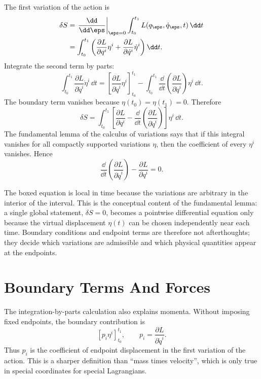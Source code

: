 \begin{derivation}
The first variation of the action is
\[
\begin{aligned}
  \delta S
  &=
  \left.\frac{\dd}{\dd\eps}\right|_{\eps=0}
  \int_{t_0}^{t_1}L(q_\eps,\dot q_\eps,t)\,\dd t\\
  &=
  \int_{t_0}^{t_1}
  \left(
    \frac{\partial L}{\partial q^i}\eta^i
    +
    \frac{\partial L}{\partial \dot q^i}\dot\eta^i
  \right)\dd t.
\end{aligned}
\]
Integrate the second term by parts:
\[
  \int_{t_0}^{t_1}
  \frac{\partial L}{\partial \dot q^i}\dot\eta^i\,\dd t
  =
  \left[
    \frac{\partial L}{\partial \dot q^i}\eta^i
  \right]_{t_0}^{t_1}
  -
  \int_{t_0}^{t_1}
  \frac{\dd}{\dd t}\left(\frac{\partial L}{\partial \dot q^i}\right)\eta^i
  \,\dd t.
\]
The boundary term vanishes because \(\eta(t_0)=\eta(t_1)=0\). Therefore
\[
  \delta S
  =
  \int_{t_0}^{t_1}
  \left[
    \frac{\partial L}{\partial q^i}
    -
    \frac{\dd}{\dd t}\left(\frac{\partial L}{\partial \dot q^i}\right)
  \right]\eta^i\,\dd t.
\]
The fundamental lemma of the calculus of variations says that if this integral
vanishes for all compactly supported variations \(\eta\), then the coefficient
of every \(\eta^i\) vanishes. Hence
\[
  \boxed{
  \frac{\dd}{\dd t}\left(\frac{\partial L}{\partial \dot q^i}\right)
  -
  \frac{\partial L}{\partial q^i}=0
  }.
\]
\end{derivation}

The boxed equation is local in time because the variations are arbitrary in the
interior of the interval. This is the conceptual content of the fundamental
lemma: a single global statement, \(\delta S=0\), becomes a pointwise
differential equation only because the virtual displacement \(\eta(t)\) can be
chosen independently near each time. Boundary conditions and endpoint terms are
therefore not afterthoughts; they decide which variations are admissible and
which physical quantities appear at the endpoints.

\section{Boundary Terms And Forces}
\label{sec:boundary-forces}

The integration-by-parts calculation also explains momenta. Without imposing
fixed endpoints, the boundary contribution is
\[
  \left[p_i\eta^i\right]_{t_0}^{t_1},
  \qquad
  p_i=\frac{\partial L}{\partial \dot q^i}.
\]
Thus \(p_i\) is the coefficient of endpoint displacement in the first variation
of the action. This is a sharper definition than ``mass times velocity'', which
is only true in special coordinates for special Lagrangians.

